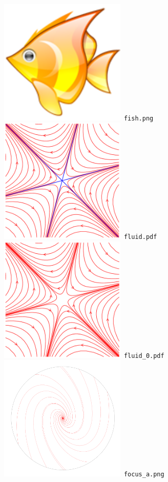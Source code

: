 \documentclass[a4paper]{amsart}
\begin{document}
\includegraphics[width=6cm]{fish.png}\verb+ fish.png+\\
\includegraphics[width=6cm]{fluid.pdf}\verb+ fluid.pdf+\\
\includegraphics[width=6cm]{fluid_0.pdf}\verb+ fluid_0.pdf+\\
\includegraphics[width=6cm]{focus_a.png}\verb+ focus_a.png+\\
\end{document}
